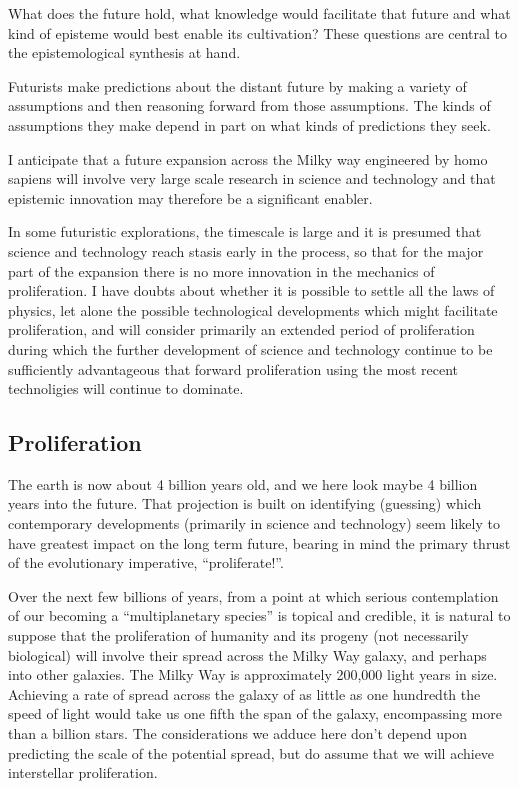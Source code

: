 \documentclass[10pt,titlepage]{article}
\begin{document}
What does the future hold, what knowledge would facilitate that future and what kind of episteme would best enable its cultivation?
These questions are central to the epistemological synthesis at hand.

Futurists make predictions about the distant future by making a variety of assumptions and then reasoning forward from those assumptions.
The kinds of assumptions they make depend in part on what kinds of predictions they seek.

I anticipate that a future expansion across the Milky way engineered by homo sapiens will involve very large scale research in science and technology and that epistemic innovation may therefore be a significant enabler.

In some futuristic explorations, the timescale is large and it is presumed that science and technology reach stasis early in the process, so that for the major part of the expansion there is no more innovation in the mechanics of proliferation.
I have doubts about whether it is possible to settle all the laws of physics, let alone the possible technological developments which might facilitate proliferation, and will consider primarily an extended period of proliferation during which the further development of science and technology continue to be sufficiently advantageous that forward proliferation using the most recent technoligies will continue to dominate.

\subsection{Proliferation}

The earth is now about 4 billion years old, and we here look maybe 4 billion years into the future.
That projection is built on identifying (guessing) which contemporary developments (primarily in science and technology) seem likely to have greatest impact on the long term future, bearing in mind the primary thrust of the evolutionary imperative, ``proliferate!''.

Over the next few billions of years, from a point at which serious contemplation of our becoming a ``multiplanetary species'' is topical and credible, it is natural to suppose that the proliferation of humanity and its progeny (not necessarily biological) will involve their spread across the Milky Way galaxy, and perhaps into other galaxies.
The Milky Way is approximately 200,000 light years in size.
Achieving a rate of spread across the galaxy of as little as one hundredth the speed of light would take us one fifth the span of the galaxy, encompassing more than a billion stars.
The considerations we adduce here don't depend upon predicting the scale of the potential spread, but do assume that we will achieve interstellar proliferation.
\end{document}
